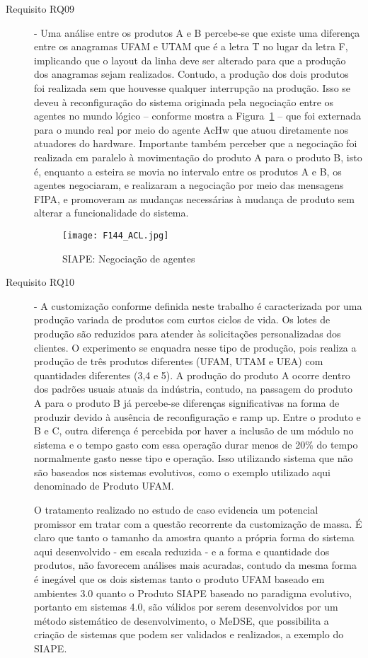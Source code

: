 \begin{description}
	\item[Requisito RQ09] - Uma análise entre os produtos A e B percebe-se que existe uma diferença entre os anagramas UFAM e UTAM que é a letra T no lugar da letra F, implicando que o layout da linha deve ser alterado para que a produção dos anagramas sejam realizados. Contudo, a produção dos dois produtos foi realizada sem que houvesse qualquer interrupção na produção. Isso se deveu à reconfiguração do sistema originada pela negociação entre os agentes no mundo lógico -- conforme mostra a Figura~\ref{F144} -- que foi externada para o mundo real por meio do agente AcHw que atuou diretamente nos atuadores do hardware. Importante também perceber que a negociação foi realizada em paralelo à movimentação do produto A para o produto B, isto é, enquanto a esteira se movia no intervalo entre os produtos A e B, os agentes negociaram, e realizaram a negociação por meio das mensagens FIPA, e promoveram as mudanças necessárias à mudança de produto sem alterar a funcionalidade do sistema.	
	
		\begin{figure}[h]
			\centering
			\texttt{[image: F144\_ACL.jpg]} 
			\caption{SIAPE: Negociação de agentes}
			\label{F144}
		\end{figure}	
		

	
	\item[Requisito RQ10] - A customização conforme definida neste trabalho é caracterizada por uma produção variada de produtos com curtos  ciclos de vida. Os lotes de produção são reduzidos para atender às solicitações personalizadas dos clientes. O experimento se enquadra nesse tipo de produção, pois realiza a produção de três produtos diferentes (UFAM, UTAM e UEA) com quantidades diferentes (3,4 e 5). A produção do produto A ocorre dentro dos padrões usuais atuais da indústria, contudo, na passagem do produto A para o produto B já percebe-se diferenças significativas na forma de produzir devido à ausência de reconfiguração e ramp up. Entre o produto e B e C, outra diferença é percebida por haver a inclusão de um módulo no sistema e o tempo gasto com essa operação durar menos de 20\% do tempo normalmente gasto nesse tipo e operação. Isso utilizando  sistema que não são baseados nos sistemas evolutivos, como o exemplo utilizado aqui denominado de Produto UFAM. \par 
	O tratamento realizado no estudo de caso evidencia um potencial promissor em tratar com a questão recorrente da customização de massa. É claro que tanto o tamanho da amostra quanto a própria forma do sistema aqui desenvolvido - em escala reduzida - e a forma e quantidade dos produtos, não favorecem análises mais acuradas, contudo da mesma forma é inegável que os dois sistemas tanto o produto UFAM baseado em ambientes 3.0 quanto o Produto SIAPE baseado no paradigma evolutivo, portanto em sistemas 4.0, são válidos por serem desenvolvidos por um método sistemático de desenvolvimento, o MeDSE, que possibilita a criação de sistemas que podem ser validados e realizados, a exemplo do SIAPE.
		

\end{description}
